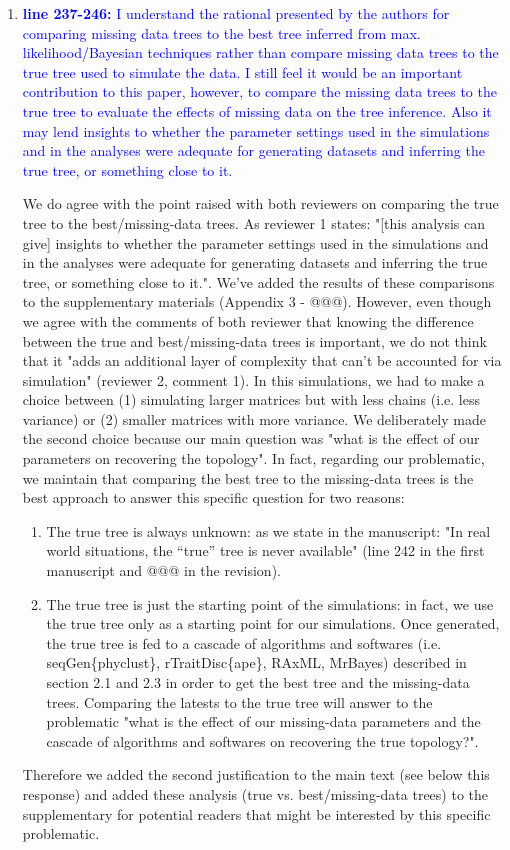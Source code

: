 \documentclass[12pt,letterpaper]{article}
\begin{document}
\begin{enumerate}
\item{\textcolor{blue}{\textbf{line 237-246:} I understand the rational presented by the authors for comparing missing data trees to the best tree inferred from max. likelihood/Bayesian techniques rather than compare missing data trees to the true tree used to simulate the data. I still feel it would be an important contribution to this paper, however, to compare the missing data trees to the true tree to evaluate the effects of missing data on the tree inference. Also it may lend insights to whether the parameter settings used in the simulations and in the analyses were adequate for generating datasets and inferring the true tree, or something close to it. }}

We do agree with the point raised with both reviewers on comparing the true tree to the best/missing-data trees.
As reviewer 1 states: "[this analysis can give] insights to whether the parameter settings used in the simulations and in the analyses were adequate for generating datasets and inferring the true tree, or something close to it.".
We've added the results of these comparisons to the supplementary materials (Appendix 3 - @@@).
However, even though we agree with the comments of both reviewer that knowing the difference between the true and best/missing-data trees is important, we do not think that it "adds an additional layer of complexity that can't be accounted for via simulation" (reviewer 2, comment 1).
In this simulations, we had to make a choice between (1) simulating larger matrices but with less chains (i.e. less variance) or (2) smaller matrices with more variance.
We deliberately made the second choice because our main question was "what is the effect of our parameters on recovering the topology".
In fact, regarding our problematic, we maintain that comparing the best tree to the missing-data trees is the best approach to answer this specific question for two reasons:
\begin{enumerate}
\item{The true tree is always unknown:} as we state in the manuscript: "In real world situations, the ``true'' tree is never available" (line 242 in the first manuscript and @@@ in the revision).
\item{The true tree is just the starting point of the simulations:} in fact, we use the true tree only as a starting point for our simulations. Once generated, the true tree is fed to a cascade of algorithms and softwares (i.e. seqGen\{phyclust\}, rTraitDisc\{ape\}, RAxML, MrBayes) described in section 2.1 and 2.3 in order to get the best tree and the missing-data trees. Comparing the latests to the true tree will answer to the problematic "what is the effect of our missing-data parameters and the cascade of algorithms and softwares on recovering the true topology?".
\end{enumerate}
Therefore we added the second justification to the main text (see below this response) and added these analysis (true vs. best/missing-data trees) to the supplementary for potential readers that might be interested by this specific problematic.


\end{enumerate}
\end{document}
